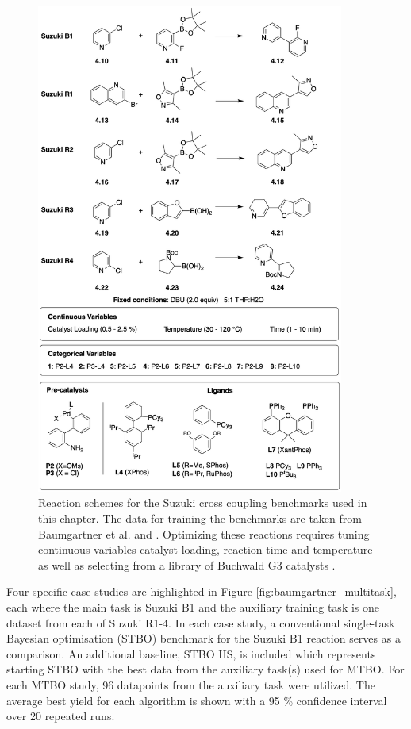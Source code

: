 \begin{figure}
    \centering
    \includegraphics[width=0.9\textwidth]{gfx/Chapter04/suzuki_benchmarks_thesis.png}
    \caption{Reaction schemes for the Suzuki cross coupling benchmarks used in this chapter. The data for training the benchmarks are taken from Baumgartner et al. \cite{Baumgartner2018} and \cite{Reizman2016b}. Optimizing these reactions requires tuning continuous variables catalyst loading, reaction time and temperature as well as selecting from a library of Buchwald G3 catalysts \cite{Bruno2013}.}
    \label{fig:benchmarks_suzuki}
\end{figure}

Four specific case studies are highlighted in Figure \ref{fig:baumgartner_multitask}, each where the main task is Suzuki B1 and the auxiliary training task is one dataset from each of Suzuki R1-4. In each case study, a conventional single-task Bayesian optimisation (STBO) benchmark for the Suzuki B1 reaction serves as a comparison.  An additional baseline, STBO HS, is included which represents starting STBO with the best data from the auxiliary task(s) used for MTBO. For each MTBO study, 96 datapoints from the auxiliary task were utilized. The average best yield for each algorithm is shown with a 95 \% confidence interval over 20 repeated runs. 

